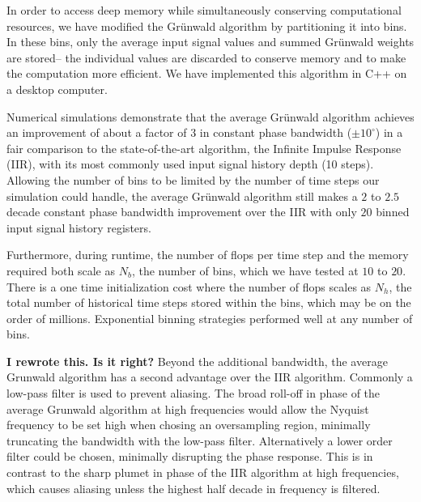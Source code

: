 In order to access deep memory while simultaneously conserving computational resources, we have modified the Gr{\"u}nwald algorithm by partitioning it into bins. In these bins, only the average input signal values and summed Gr{\"u}nwald weights are stored-- the individual values are discarded to conserve memory and to make the computation more efficient. We have implemented this algorithm in C++ on a desktop computer. 

Numerical simulations demonstrate that the average Gr{\"u}nwald algorithm achieves an improvement of about a factor of $3$ in constant phase bandwidth ($\pm 10^\circ$) in a fair comparison to the state-of-the-art algorithm, the Infinite Impulse Response (IIR), with its most commonly used input signal history depth (10 steps). Allowing the number of bins to be limited by the number of time steps our simulation could handle, the average Gr{\"u}nwald algorithm still makes a $2$ to $2.5$ decade constant phase bandwidth improvement over the IIR with only $20$ binned input signal history registers. 

Furthermore, during runtime, the number of flops per time step and the memory required both scale as $N_b$, the number of bins, which we have tested at $10$ to $20$. There is a one time initialization cost where the number of flops scales as $N_h$, the total number of historical time steps stored within the bins, which may be on the order of millions. Exponential binning strategies performed well at any number of bins. 

{\bf I rewrote this. Is it right?}
Beyond the additional bandwidth, the average Grunwald algorithm has a second advantage over the IIR algorithm. Commonly a low-pass filter is used to prevent aliasing. The broad roll-off  in phase of the average Grunwald algorithm at high frequencies would allow the Nyquist frequency to be set high when chosing an oversampling region, minimally truncating the bandwidth with the low-pass filter. Alternatively a lower order filter could be chosen, minimally disrupting the phase response. This is in contrast to the sharp plumet in phase of the IIR algorithm at high frequencies, which causes aliasing unless the highest half decade in frequency is filtered.


